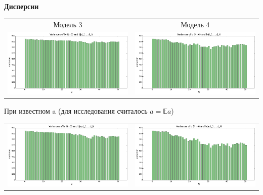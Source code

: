 \documentclass[12pt, a4paper]{article}
\begin{document}
\begin{center}
			\textbf{Дисперсии}
			\begin{tabular}{ c  c }
  				Модель 3 & Модель 4 \\
  				\includegraphics[width=8.5cm]{var_m3_d_gen.png} &
  				\includegraphics[width=8.5cm]{var_m4_d_gen.png} \\
  			\end{tabular}
  			При известном a (для исследования считалось $a = \mathbb{E}a$)
  			\begin{tabular}{ c  c }
  				\includegraphics[width=8.5cm]{var_m3_ad_gen.png} &
  				\includegraphics[width=8.5cm]{var_m4_ad_gen.png} \\
			\end{tabular}
			
			\end{center}
			
\end{document}
